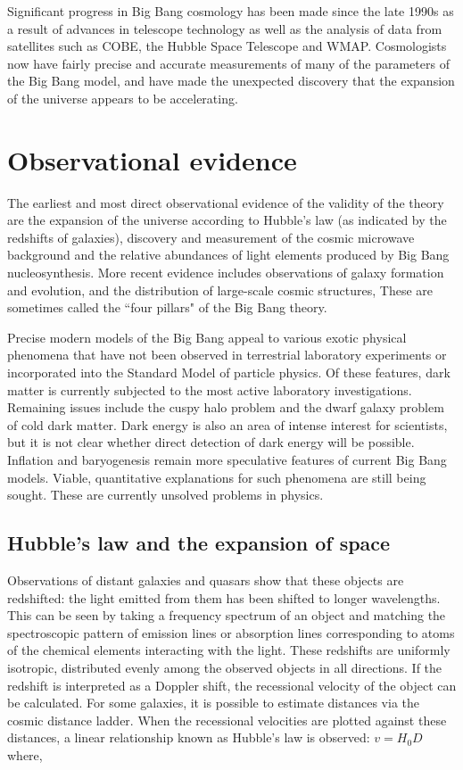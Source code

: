 \documentclass[14pt, oneside]{book}
\begin{document}
		Significant progress in Big Bang cosmology has been made since the late 1990s as a result of advances in telescope technology as well as the analysis of data from satellites such as COBE, the Hubble Space Telescope and WMAP. Cosmologists now have fairly precise and accurate measurements of many of the parameters of the Big Bang model, and have made the unexpected discovery that the expansion of the universe appears to be accelerating.

\chapter{Observational evidence}
	The earliest and most direct observational evidence of the validity of the theory are the expansion of the universe according to Hubble's law (as indicated by the redshifts of galaxies), discovery and measurement of the cosmic microwave background and the relative abundances of light elements produced by Big Bang nucleosynthesis. More recent evidence includes observations of galaxy formation and evolution, and the distribution of large-scale cosmic structures, These are sometimes called the ``four pillars" of the Big Bang theory.
	
	Precise modern models of the Big Bang appeal to various exotic physical phenomena that have not been observed in terrestrial laboratory experiments or incorporated into the Standard Model of particle physics. Of these features, dark matter is currently subjected to the most active laboratory investigations. Remaining issues include the cuspy halo problem and the dwarf galaxy problem of cold dark matter. Dark energy is also an area of intense interest for scientists, but it is not clear whether direct detection of dark energy will be possible. Inflation and baryogenesis remain more speculative features of current Big Bang models. Viable, quantitative explanations for such phenomena are still being sought. These are currently unsolved problems in physics.

	\section{Hubble's law and the expansion of space}
		Observations of distant galaxies and quasars show that these objects are redshifted: the light emitted from them has been shifted to longer wavelengths. This can be seen by taking a frequency spectrum of an object and matching the spectroscopic pattern of emission lines or absorption lines corresponding to atoms of the chemical elements interacting with the light. These redshifts are uniformly isotropic, distributed evenly among the observed objects in all directions. If the redshift is interpreted as a Doppler shift, the recessional velocity of the object can be calculated. For some galaxies, it is possible to estimate distances via the cosmic distance ladder. When the recessional velocities are plotted against these distances, a linear relationship known as Hubble's law is observed: $v=H_{0}D$ where,
\end{document}
